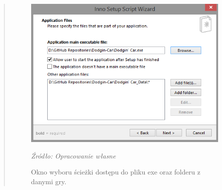 \begin{quotation}
\begin{figure}[!h]
\centering
  \includegraphics[width=0.7\linewidth]{inno.png}
  \caption{Okno wyboru ścieżki dostępu do pliku exe oraz folderu z danymi gry.}\label{rys_30}
  \begin{minipage}[t]{0.75\linewidth}
    \emph{Źródło: Opracowanie własne}
  \end{minipage}
\end{figure}

\end{quotation}
